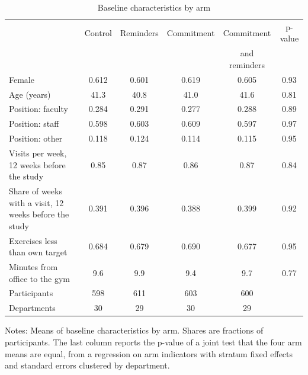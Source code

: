 \begin{table}[t]
\centering
\small
\begin{threeparttable}
\caption{Baseline characteristics by arm}
\label{tab:balance}
\begin{tabular}{@{}p{5.2cm}ccccc@{}}
\toprule
 & Control & Reminders & Commitment & Commitment & p-value \\
 & & & & and reminders & \\
\midrule
Female & 0.612 & 0.601 & 0.619 & 0.605 & 0.93 \\
Age (years) & 41.3 & 40.8 & 41.0 & 41.6 & 0.81 \\
Position: faculty & 0.284 & 0.291 & 0.277 & 0.288 & 0.89 \\
Position: staff & 0.598 & 0.603 & 0.609 & 0.597 & 0.97 \\
Position: other & 0.118 & 0.124 & 0.114 & 0.115 & 0.95 \\
Visits per week, 12 weeks before the study & 0.85 & 0.87 & 0.86 & 0.87 & 0.84 \\
Share of weeks with a visit, 12 weeks before the study & 0.391 & 0.396 & 0.388 & 0.399 & 0.92 \\
Exercises less than own target & 0.684 & 0.679 & 0.690 & 0.677 & 0.95 \\
Minutes from office to the gym & 9.6 & 9.9 & 9.4 & 9.7 & 0.77 \\
\midrule
Participants & 598 & 611 & 603 & 600 & \\
Departments & 30 & 29 & 30 & 29 & \\
\bottomrule
\end{tabular}
\begin{tablenotes}
\small
\item[] Notes: Means of baseline characteristics by arm. Shares are fractions of participants. The last column reports the p-value of a joint test that the four arm means are equal, from a regression on arm indicators with stratum fixed effects and standard errors clustered by department.
\end{tablenotes}
\end{threeparttable}
\end{table}
